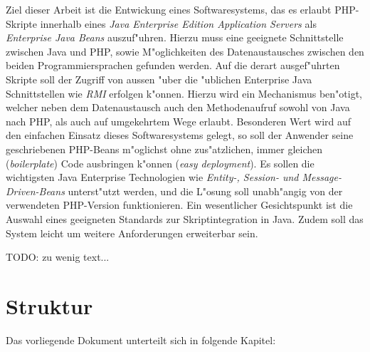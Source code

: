 Ziel dieser Arbeit ist die Entwickung eines Softwaresystems, das es erlaubt PHP-Skripte innerhalb eines 
\emph{Java Enterprise Edition Application Servers} als \emph{Enterprise Java Beans} auszuf"uhren.
Hierzu muss eine geeignete Schnittstelle zwischen Java und PHP, sowie M"oglichkeiten des Datenaustausches zwischen
den beiden Programmiersprachen gefunden werden. Auf die derart ausgef"uhrten Skripte soll der Zugriff von aussen "uber
die "ublichen Enterprise Java Schnittstellen wie \emph{RMI} erfolgen k"onnen. Hierzu wird ein Mechanismus ben"otigt,
welcher neben dem Datenaustausch auch den Methodenaufruf sowohl von Java nach PHP, als auch auf umgekehrtem Wege 
erlaubt. Besonderen Wert wird auf den einfachen Einsatz dieses Softwaresystems gelegt, so soll der Anwender
seine geschriebenen PHP-Beans m"oglichst ohne zus"atzlichen, immer gleichen (\emph{boilerplate}) Code ausbringen
k"onnen (\emph{easy deployment}). Es sollen die wichtigsten Java Enterprise Technologien wie
\emph{Entity-, Session- und Message-Driven-Beans} unterst"utzt werden, und die L"osung soll unabh"angig von der
verwendeten PHP-Version funktionieren. Ein wesentlicher Gesichtspunkt ist die Auswahl eines geeigneten Standards
zur Skriptintegration in Java. Zudem soll das System leicht um weitere Anforderungen erweiterbar sein.


TODO: zu wenig text...

\section{Struktur}
\label{sec:intro:structure}

Das vorliegende Dokument unterteilt sich in folgende Kapitel:

